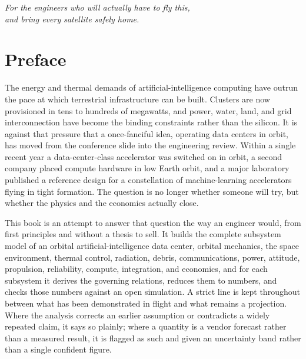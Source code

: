 \documentclass[
  11pt,
  openany,
  oneside]{book}
\begin{document}
\thispagestyle{empty}
\vspace*{0.32\textheight}
\begin{center}
{\itshape\large\color{brandGray} For the engineers who will actually have to fly this,\\[4pt]
and bring every satellite safely home.}
\end{center}
\clearpage

{\hypersetup{linkcolor=brandSlate}
\tableofcontents}
\clearpage
\listoffigures
\clearpage
\listoftables
\clearpage

\chapter*{Preface}
The energy and thermal demands of artificial-intelligence computing have outrun the pace at which
terrestrial infrastructure can be built. Clusters are now provisioned in tens to hundreds of megawatts,
and power, water, land, and grid interconnection have become the binding constraints rather than the
silicon. It is against that pressure that a once-fanciful idea, operating data centers in orbit, has
moved from the conference slide into the engineering review. Within a single recent year a
data-center-class accelerator was switched on in orbit, a second company placed compute hardware in low
Earth orbit, and a major laboratory published a reference design for a constellation of machine-learning
accelerators flying in tight formation. The question is no longer whether someone will try, but whether
the physics and the economics actually close.

This book is an attempt to answer that question the way an engineer would, from first principles and
without a thesis to sell. It builds the complete subsystem model of an orbital artificial-intelligence
data center, orbital mechanics, the space environment, thermal control, radiation, debris,
communications, power, attitude, propulsion, reliability, compute, integration, and economics, and for
each subsystem it derives the governing relations, reduces them to numbers, and checks those numbers
against an open simulation. A strict line is kept throughout between what has been demonstrated in flight
and what remains a projection. Where the analysis corrects an earlier assumption or contradicts a widely
repeated claim, it says so plainly; where a quantity is a vendor forecast rather than a measured result,
it is flagged as such and given an uncertainty band rather than a single confident figure.
\end{document}
